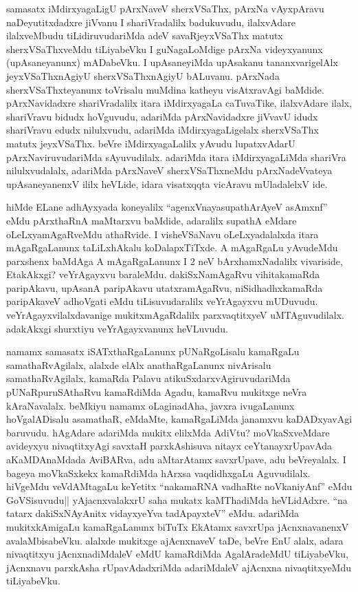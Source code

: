 \begin{artha}
samasatx iMdirxyagaLigU pArxNaveV sherxVSaThx, pArxNa vAyxpAravu naDeyutitxdadxre jiVvanu I shariVradalilx badukuvudu, ilalxvAdare ilalxveMbudu tiLidiruvudariMda adeV savaRjeyxVSaThx matutx sherxVSaThxveMdu tiLiyabeVku I guNagaLoMdige pArxNa videyxyanunx (upAsaneyanunx) mADabeVku. I upAsaneyiMda upAsakanu tananxvarigelAlx jeyxVSaThxnAgiyU sherxVSaThxnAgiyU bALuvanu. pArxNada sherxVSaThxteyanunx toVrisalu muMdina katheyu visAtxravAgi baMdide. pArxNavidadxre shariVradalilx itara iMdirxyagaLa caTuvaTike, ilalxvAdare ilalx, shariVravu bidudx hoVguvudu, adariMda pArxNavidadxre jiVvavU idudx shariVravu edudx nilulxvudu, adariMda iMdirxyagaLigelalx sherxVSaThx matutx jeyxVSaThx. beVre iMdirxyagaLalilx yAvudu lupatxvAdarU pArxNaviruvudariMda sAyuvudilalx. adariMda itara iMdirxyagaLiMda shariVra nilulxvudalalx, adariMda pArxNaveV sherxVSaThxneMdu pArxNadeVvateya upAsaneyanenxV ililx heVLide, idara visatxqqta vicAravu mUladalelxV ide.
\end{artha}


\begin{artha}
hiMde ELane adhAyxyada koneyalilx ``agenxVnayasupathArAyeV asAmxnf'' eMdu pArxthaRnA maMtarxvu baMdide, adaralilx supathA eMdare oLeLxyamAgaRveMdu athaRvide. I visheVSaNavu oLeLxyadalalxda itara mAgaRgaLanunx taLiLxhAkalu koDalapxTiTxde. A mAgaRgaLu yAvudeMdu parxshenx baMdAga A mAgaRgaLanunx I 2 neV bArxhamxNadalilx vivariside, EtakAkxgi? veYrAgayxvu baraleMdu. dakiSxNamAgaRvu vihitakamaRda paripAkavu, upAsanA paripAkavu utatxramAgaRvu, niSidhadhxkamaRda paripAkaveV adhoVgati eMdu tiLisuvudaralilx veYrAgayxvu mUDuvudu. veYrAgayxvilalxdavanige mukitxmAgaRdalilx parxvaqtitxyeV uMTAguvudilalx. adakAkxgi shurxtiyu veYrAgayxvanunx heVLuvudu.
\end{artha}


\begin{artha}
namamx samasatx iSATxthaRgaLanunx pUNaRgoLisalu kamaRgaLu samathaRvAgilalx, alalxde elAlx anathaRgaLanunx nivArisalu samathaRvAgilalx, kamaRda Palavu atikuSxdarxvAgiruvudariMda pUNaRpuruSAthaRvu kamaRdiMda Agadu, kamaRvu mukitxge neVra kAraNavalalx. beMkiyu namamx oLaginadAha, javxra ivugaLanunx hoVgalADisalu asamathaR, eMdaMte, kamaRgaLiMda janamxvu kaDADxyavAgi baruvudu. hAgAdare adariMda mukitx elilxMda AdiVtu? moVkaSxveMdare avideyxyu nivaqtitxyAgi savxtaH parxkAshisuva nitayx ceYtanayxrUpavAda aKaMDAnaMdada AviBARva, adu aMtarAtamx savxrUpave, adu beVreyalalx. I bageya moVkaSxkekx kamaRdiMda hArxsa vaqdidhxgaLu Aguvudilalx. hiVgeMdu veVdAMtagaLu keYetitx ``nakamaRNA vadhaRte noVkaniyAnf'' eMdu GoVSisuvudu|| yAjacnxvalakxrU saha mukatx kaMThadiMda heVLidAdxre. ``na tatarx dakiSxNAyAnitx vidayxyeYva tadApayxteV'' eMdu. adariMda mukitxkAmigaLu kamaRgaLanunx biTuTx EkAtamx savxrUpa jAcnxnavanenxV avalaMbisabeVku. alalxde mukitxge ajAcnxnaveV taDe, beVre EnU alalx, adara nivaqtitxyu jAcnxnadiMdaleV eMdU kamaRdiMda AgalAradeMdU tiLiyabeVku, jAcnxnavu parxkAsha rUpavAdadxriMda adariMdaleV ajAcnxna nivaqtitxyeMdu tiLiyabeVku.
\end{artha}

